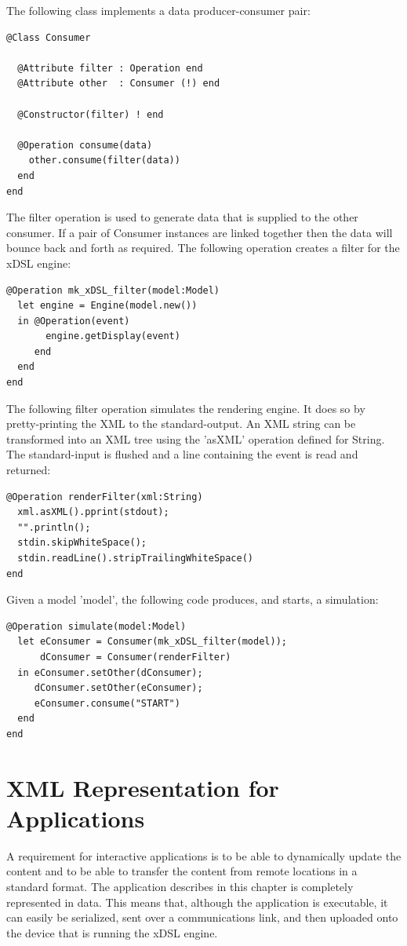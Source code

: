 \newpage{}

The following class implements a data producer-consumer pair:

\begin{lstlisting}
@Class Consumer

  @Attribute filter : Operation end
  @Attribute other  : Consumer (!) end
    
  @Constructor(filter) ! end
    
  @Operation consume(data)
    other.consume(filter(data))
  end
end
\end{lstlisting}The filter operation is used to generate data that is supplied to
the other consumer. If a pair of Consumer instances are linked together
then the data will bounce back and forth as required. The following
operation creates a filter for the xDSL engine:

\begin{lstlisting}
@Operation mk_xDSL_filter(model:Model)
  let engine = Engine(model.new())
  in @Operation(event)
       engine.getDisplay(event)
     end
  end
end
\end{lstlisting}The following filter operation simulates the rendering engine. It
does so by pretty-printing the XML to the standard-output. An XML
string can be transformed into an XML tree using the 'asXML' operation
defined for String. The standard-input is flushed and a line containing
the event is read and returned:

\begin{lstlisting}
@Operation renderFilter(xml:String)
  xml.asXML().pprint(stdout);
  "".println();
  stdin.skipWhiteSpace();
  stdin.readLine().stripTrailingWhiteSpace()
end 
\end{lstlisting}Given a model 'model', the following code produces, and starts, a
simulation:

\begin{lstlisting}
@Operation simulate(model:Model)
  let eConsumer = Consumer(mk_xDSL_filter(model));
      dConsumer = Consumer(renderFilter)
  in eConsumer.setOther(dConsumer);
     dConsumer.setOther(eConsumer);
     eConsumer.consume("START")
  end
end
\end{lstlisting}
\section{XML Representation for Applications\label{sec:XML-Representation-for}}

A requirement for interactive applications is to be able to dynamically
update the content and to be able to transfer the content from remote
locations in a standard format. The application describes in this
chapter is completely represented in data. This means that, although
the application is executable, it can easily be serialized, sent over
a communications link, and then uploaded onto the device that is running
the xDSL engine.

